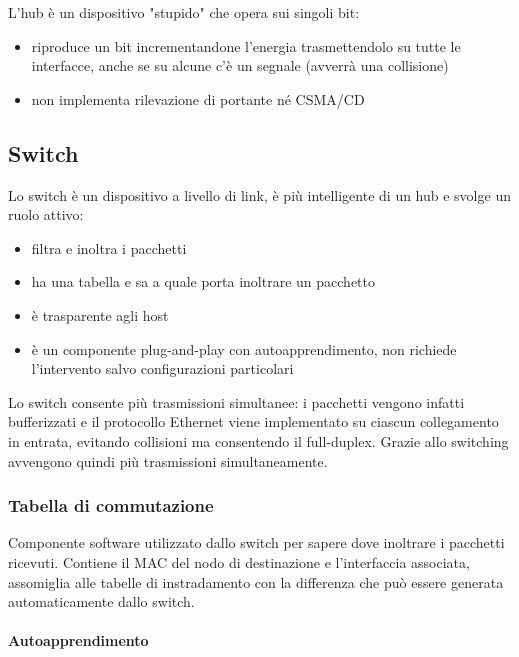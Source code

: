 \documentclass{report}
\begin{document}
L'hub è un dispositivo "stupido" che opera sui singoli bit:

\begin{itemize}
\item
  riproduce un bit incrementandone l'energia trasmettendolo su tutte le
  interfacce, anche se su alcune c'è un segnale (avverrà una collisione)
\item
  non implementa rilevazione di portante né CSMA/CD
\end{itemize}

\hypertarget{header-n208}{%
\subsection{Switch}\label{header-n208}}

Lo switch è un dispositivo a livello di link, è più intelligente di un
hub e svolge un ruolo attivo:

\begin{itemize}
\item
  filtra e inoltra i pacchetti
\item
  ha una tabella e sa a quale porta inoltrare un pacchetto
\item
  è trasparente agli host
\item
  è un componente plug-and-play con autoapprendimento, non richiede
  l'intervento salvo configurazioni particolari
\end{itemize}

Lo switch consente più trasmissioni simultanee: i pacchetti vengono
infatti bufferizzati e il protocollo Ethernet viene implementato su
ciascun collegamento in entrata, evitando collisioni ma consentendo il
full-duplex. Grazie allo switching avvengono quindi più trasmissioni
simultaneamente.

\hypertarget{header-n220}{%
\subsubsection{Tabella di commutazione}\label{header-n220}}

Componente software utilizzato dallo switch per sapere dove inoltrare i
pacchetti ricevuti. Contiene il MAC del nodo di destinazione e
l'interfaccia associata, assomiglia alle tabelle di instradamento con la
differenza che può essere generata automaticamente dallo switch.

\hypertarget{header-n222}{%
\paragraph{Autoapprendimento}\label{header-n222}}
\end{document}
